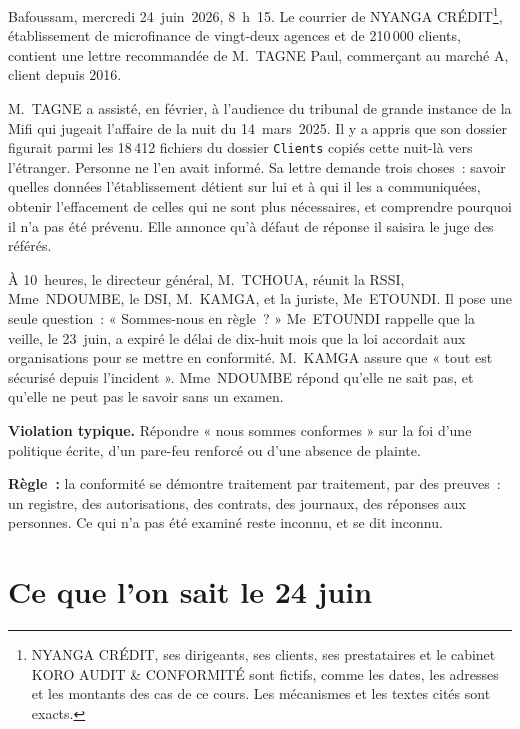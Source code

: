 Bafoussam, mercredi 24~juin~2026, 8~h~15. Le courrier de NYANGA
CRÉDIT\footnote{NYANGA CRÉDIT, ses dirigeants, ses clients, ses prestataires
et le cabinet KORO AUDIT \& CONFORMITÉ sont fictifs, comme les dates, les
adresses et les montants des cas de ce cours. Les mécanismes et les textes
cités sont exacts.}, établissement de microfinance de vingt-deux agences et
de 210\,000 clients, contient une lettre recommandée de M.~TAGNE Paul,
commerçant au marché A, client depuis 2016.

M.~TAGNE a assisté, en février, à l'audience du tribunal de grande instance
de la Mifi qui jugeait l'affaire de la nuit du 14~mars~2025. Il y a appris
que son dossier figurait parmi les 18\,412 fichiers du dossier
\texttt{Clients} copiés cette nuit-là vers l'étranger. Personne ne l'en
avait informé. Sa lettre demande trois choses~: savoir quelles données
l'établissement détient sur lui et à qui il les a communiquées, obtenir
l'effacement de celles qui ne sont plus nécessaires, et comprendre pourquoi
il n'a pas été prévenu. Elle annonce qu'à défaut de réponse il saisira le
juge des référés.

À 10~heures, le directeur général, M.~TCHOUA, réunit la RSSI, Mme~NDOUMBE,
le DSI, M.~KAMGA, et la juriste, Me~ETOUNDI. Il pose une seule question~:
« Sommes-nous en règle~? » Me~ETOUNDI rappelle que la veille, le 23~juin,
a expiré le délai de dix-huit mois que la loi accordait aux organisations
pour se mettre en conformité. M.~KAMGA assure que « tout est sécurisé
depuis l'incident ». Mme~NDOUMBE répond qu'elle ne sait pas, et qu'elle ne
peut pas le savoir sans un examen.

\begin{boxalert}
\textbf{Violation typique.} Répondre « nous sommes conformes » sur la foi
d'une politique écrite, d'un pare-feu renforcé ou d'une absence de
plainte.

\smallskip
\textbf{Règle~:} la conformité se démontre traitement par traitement, par
des preuves~: un registre, des autorisations, des contrats, des journaux,
des réponses aux personnes. Ce qui n'a pas été examiné reste inconnu, et se
dit inconnu.
\end{boxalert}

\section{Ce que l'on sait le 24 juin}
\label{sec:p00-situation}

